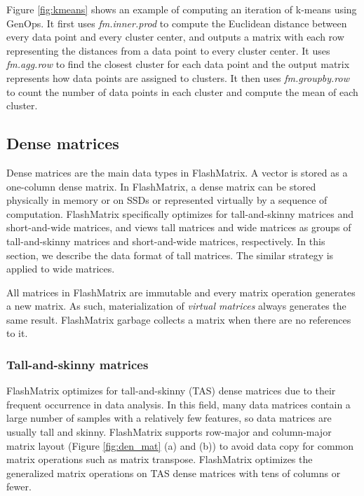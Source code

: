 Figure \ref{fig:kmeans} shows an example of computing an iteration of k-means
\cite{kmeans} using GenOps. It first uses \textit{fm.inner.prod} to
compute the Euclidean distance between every data point and every cluster center,
and outputs a matrix with each row representing the distances from a data
point to every cluster center. It uses \textit{fm.agg.row} to find the closest
cluster for each data point and the output matrix represents how data points
are assigned to clusters. It then uses \textit{fm.groupby.row} to count
the number of data points in each cluster and compute the mean of each cluster.

\subsection{Dense matrices}
Dense matrices are the main data types in FlashMatrix. A vector is stored
as a one-column dense matrix. In FlashMatrix, a dense matrix can be stored
physically in memory or on SSDs or represented virtually by a sequence of
computation. FlashMatrix specifically optimizes for tall-and-skinny matrices
and short-and-wide matrices, and views tall matrices and wide matrices
as groups of tall-and-skinny matrices and short-and-wide matrices, respectively.
In this section, we describe the data format of tall matrices. The similar
strategy is applied to wide matrices.

All matrices in FlashMatrix are immutable and every
matrix operation generates a new matrix. As such, materialization of
\textit{virtual matrices} always generates the same result. FlashMatrix
garbage collects a matrix when there are no references to it.

\subsubsection{Tall-and-skinny matrices} \label{sec:tas_mat}

FlashMatrix optimizes for tall-and-skinny (TAS) dense matrices due to their
frequent occurrence in data analysis. In this field, many data matrices contain
a large number of samples with a relatively few features, so data matrices
are usually tall and skinny. FlashMatrix supports row-major and column-major
matrix layout (Figure \ref{fig:den_mat} (a) and (b)) to avoid data copy for
common matrix operations such as matrix transpose. FlashMatrix optimizes
the generalized matrix operations on TAS dense matrices with tens of columns
or fewer.

